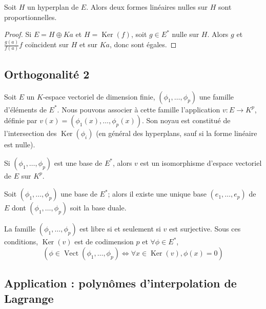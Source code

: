 \begin{thm}
Soit $H$ un hyperplan de $E$. Alors deux formes linéaires nulles sur $H$ sont proportionnelles.
\end{thm}

\begin{proof}
Si $E = H \oplus Ka$ et $H = \operatorname{Ker}(f)$, soit $g \in E^*$ nulle sur $H$. Alors $g$ et $\frac{g(a)}{f(a)}f$ coïncident sur $H$ et sur $Ka$, donc sont égales.
\end{proof}

\subsection{Orthogonalité 2}

\begin{rem}
Soit $E$ un $K$-espace vectoriel de dimension finie, $(\phi_1,\ldots,\phi_p)$ une famille d'éléments de $E^*$. Nous pouvons associer à cette famille l'application $v : E \to K^p$, définie par $v(x) = (\phi_1(x),\ldots,\phi_p(x))$. Son noyau est constitué de l'intersection des $\operatorname{Ker}(\phi_i)$ (en général des hyperplans, sauf si la forme linéaire est nulle).
\end{rem}

\begin{prop}
Si $(\phi_1,\ldots,\phi_p)$ est une base de $E^*$, alors $v$ est un isomorphisme d'espace vectoriel de $E$ sur $K^p$.
\end{prop}

\begin{thm}
Soit $(\phi_1,\ldots,\phi_p)$ une base de $E^*$; alors il existe une unique base $(e_1,\ldots,e_p)$ de $E$ dont $(\phi_1,\ldots,\phi_p)$ soit la base duale.
\end{thm}

\begin{prop}
La famille $(\phi_1,\ldots,\phi_p)$ est libre si et seulement si $v$ est surjective. Sous ces conditions, $\operatorname{Ker}(v)$ est de codimension $p$ et $\forall \phi \in E^*$,
\[ (\phi \in \operatorname{Vect}(\phi_1,\ldots,\phi_p) \Leftrightarrow \forall x \in \operatorname{Ker}(v), \phi(x) = 0) \]
\end{prop}

\subsection{Application : polynômes d'interpolation de Lagrange}

